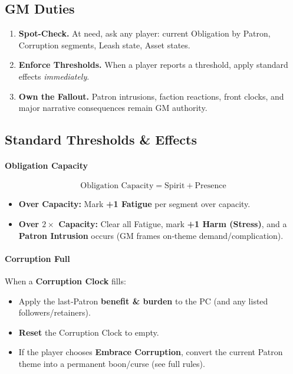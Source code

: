 \subsection{GM Duties}
\label{subsec:gm-module-duties}
\begin{enumerate}
  \item \textbf{Spot-Check.} At need, ask any player: current Obligation by Patron, Corruption segments, Leash state, Asset states.
  \item \textbf{Enforce Thresholds.} When a player reports a threshold, apply standard effects \emph{immediately}.
  \item \textbf{Own the Fallout.} Patron intrusions, faction reactions, front clocks, and major narrative consequences remain GM authority.
\end{enumerate}

\subsection{Standard Thresholds \& Effects}
\label{subsec:module-thresholds}
\paragraph{Obligation Capacity}
\label{subsec:obligation-capacity}
\[
\text{Obligation Capacity} = \text{Spirit} + \text{Presence}
\]
\begin{itemize}
  \item \textbf{Over Capacity:} Mark \textbf{+1 Fatigue} per segment over capacity.
  \item \textbf{Over \(2\times\) Capacity:} Clear all Fatigue, mark \textbf{+1 Harm (Stress)}, and a \textbf{Patron Intrusion} occurs (GM frames on‑theme demand/complication).
\end{itemize}

\paragraph{Corruption Full}
When a \textbf{Corruption Clock} fills:
\begin{itemize}
  \item Apply the last‑Patron \textbf{benefit \& burden} to the PC (and any listed followers/retainers).
  \item \textbf{Reset} the Corruption Clock to empty.
  \item If the player chooses \textbf{Embrace Corruption}, convert the current Patron theme into a permanent boon/curse (see full rules).
\end{itemize}

